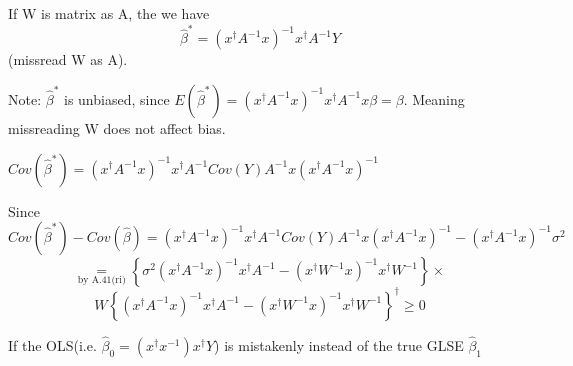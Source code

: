 \documentclass{article}
\begin{document}
If W is matrix as A, the we have%
\begin{equation*}
\hat{\beta}^{\ast }=\left( x^{\dagger }A^{-1}x\right) ^{-1}x^{\dagger
}A^{-1}Y
\end{equation*}%
(missread W as A).

\bigskip

Note: $\hat{\beta}^{\ast }$ is unbiased, since $E\left( \hat{\beta}^{\ast
}\right) =\left( x^{\dagger }A^{-1}x\right) ^{-1}x^{\dagger }A^{-1}x\beta
=\beta $. Meaning missreading W does not affect bias.

$Cov\left( \hat{\beta}^{\ast }\right) =\left( x^{\dagger }A^{-1}x\right)
^{-1}x^{\dagger }A^{-1}Cov\left( Y\right) A^{-1}x\left( x^{\dagger
}A^{-1}x\right) ^{-1}$

\bigskip

Since $Cov\left( \hat{\beta}^{\ast }\right) -Cov\left( \hat{\beta}\right)
=\left( x^{\dagger }A^{-1}x\right) ^{-1}x^{\dagger }A^{-1}Cov\left( Y\right)
A^{-1}x\left( x^{\dagger }A^{-1}x\right) ^{-1}-\left( x^{\dagger
}A^{-1}x\right) ^{-1}\sigma ^{2}$%
\begin{equation*}
\underset{\text{by A.41(ri)}}{=}\left\{ \sigma ^{2}\left( x^{\dagger
}A^{-1}x\right) ^{-1}x^{\dagger }A^{-1}-\left( x^{\dagger }W^{-1}x\right)
^{-1}x^{\dagger }W^{-1}\right\} \times
\end{equation*}%
\begin{equation*}
W\left\{ \left( x^{\dagger }A^{-1}x\right) ^{-1}x^{\dagger }A^{-1}-\left(
x^{\dagger }W^{-1}x\right) ^{-1}x^{\dagger }W^{-1}\right\} ^{\dagger }\geq 0
\end{equation*}

\bigskip

If the OLS(i.e. $\hat{\beta}_{0}=\left( x^{\dagger }x^{-1}\right) x^{\dagger
}Y$) is mistakenly instead of the true GLSE $\hat{\beta}_{1}$
\end{document}
